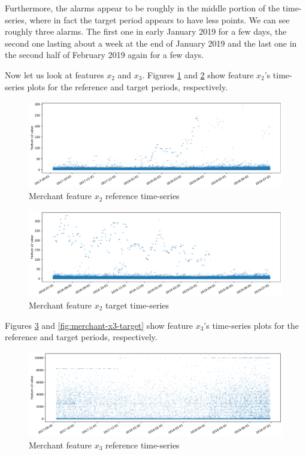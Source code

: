 Furthermore, the alarms appear to be roughly in the middle portion of the time-series, where in fact the target period appears to have less points. We can see roughly three alarms. The first one in early January 2019 for a few days, the second one lasting about a week at the end of January 2019 and the last one in the second half of February 2019 again for a few days.

Now let us look at features $x_2$ and $x_3$. Figures \ref{fig:merchant-x2-reference} and \ref{fig:merchant-x2-target} show feature $x_2$'s time-series plots for the reference and target periods, respectively.
\begin{figure}[!htb]
    \begin{center}
      \includegraphics[scale=0.5]{figures/merchant-x2-reference.pdf}
      \caption{Merchant feature $x_2$ reference time-series}
      \label{fig:merchant-x2-reference}
    \end{center}
\end{figure}
\begin{figure}[!htb]
    \begin{center}
      \includegraphics[scale=0.5]{figures/merchant-x2-target.pdf}
      \caption{Merchant feature $x_2$ target time-series}
      \label{fig:merchant-x2-target}
    \end{center}
\end{figure}
Figures \ref{fig:merchant-x3-reference} and \ref{fig:merchant-x3-target} show feature $x_3$'s time-series plots for the reference and target periods, respectively.
\begin{figure}[!htb]
    \begin{center}
      \includegraphics[scale=0.5]{figures/merchant-x3-reference.pdf}
      \caption{Merchant feature $x_3$ reference time-series}
      \label{fig:merchant-x3-reference}
    \end{center}
\end{figure}
